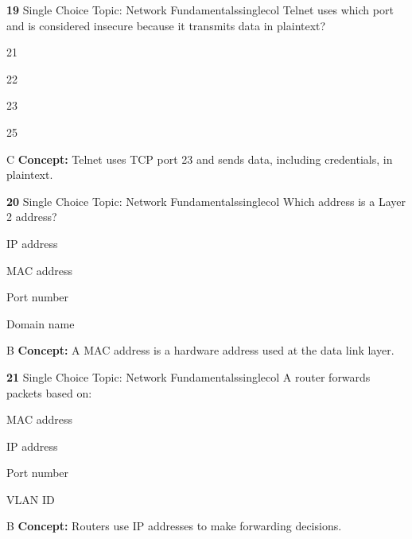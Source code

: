 \documentclass[10pt,a4paper]{article}
\begin{document}
\begin{qcard}{\color{white}\textbf{19} \hfill \small Single Choice \textbar{} Topic: Network Fundamentals}{singlecol}
Telnet uses which port and is considered insecure because it transmits data in plaintext?

\begin{qoptions}
\item 21
\item 22
\item 23
\item 25
\end{qoptions}
\begin{explainbox}{C}
\textbf{Concept:} Telnet uses TCP port 23 and sends data, including credentials, in plaintext.
\end{explainbox}
\end{qcard}

\begin{qcard}{\color{white}\textbf{20} \hfill \small Single Choice \textbar{} Topic: Network Fundamentals}{singlecol}
Which address is a Layer 2 address?

\begin{qoptions}
\item IP address
\item MAC address
\item Port number
\item Domain name
\end{qoptions}
\begin{explainbox}{B}
\textbf{Concept:} A MAC address is a hardware address used at the data link layer.
\end{explainbox}
\end{qcard}

\begin{qcard}{\color{white}\textbf{21} \hfill \small Single Choice \textbar{} Topic: Network Fundamentals}{singlecol}
A router forwards packets based on:

\begin{qoptions}
\item MAC address
\item IP address
\item Port number
\item VLAN ID
\end{qoptions}
\begin{explainbox}{B}
\textbf{Concept:} Routers use IP addresses to make forwarding decisions.
\end{explainbox}
\end{qcard}
\end{document}
